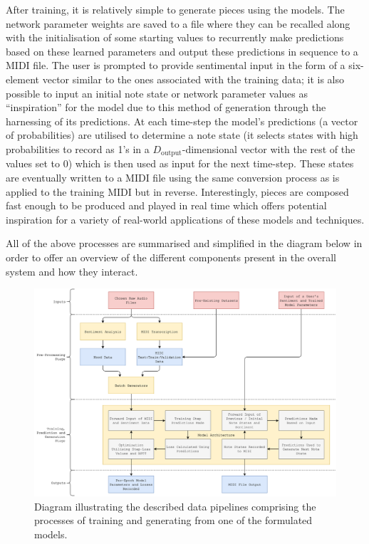 \documentclass[12pt,]{article}
\begin{document}
After training, it is relatively simple to generate pieces using the
models. The network parameter weights are saved to a file where they can
be recalled along with the initialisation of some starting values to
recurrently make predictions based on these learned parameters and
output these predictions in sequence to a MIDI file. The user is
prompted to provide sentimental input in the form of a six-element
vector similar to the ones associated with the training data; it is also
possible to input an initial note state or network parameter values as
``inspiration'' for the model due to this method of generation through
the harnessing of its predictions. At each time-step the model's
predictions (a vector of probabilities) are utilised to determine a note
state (it selects states with high probabilities to record as 1's in a
\(D_{\text{output}}\)-dimensional vector with the rest of the values set
to 0) which is then used as input for the next time-step. These states
are eventually written to a MIDI file using the same conversion process
as is applied to the training MIDI but in reverse. Interestingly, pieces
are composed fast enough to be produced and played in real time which
offers potential inspiration for a variety of real-world applications of
these models and techniques.

All of the above processes are summarised and simplified in the diagram
below in order to offer an overview of the different components present
in the overall system and how they interact.

\begin{figure}
\centering
\includegraphics{Images/processdiagram.png}
\caption{Diagram illustrating the described data pipelines comprising
the processes of training and generating from one of the formulated
models.}
\end{figure}
\end{document}
